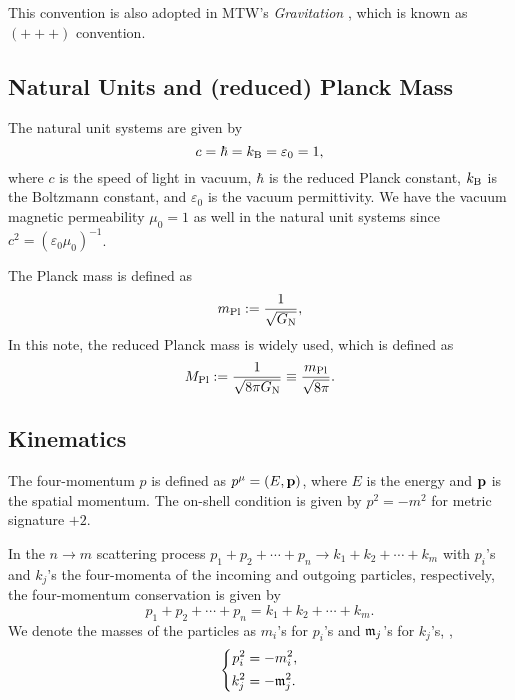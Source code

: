 \documentclass{article}
\begin{document}
            This convention is also adopted in MTW's \textit{Gravitation} \cite{Misner:1973prb}, which is known as $(+ + +)$ convention.

        \subsection{Natural Units and (reduced) Planck Mass}

            The natural unit systems are given by 
            \begin{equation}
                c = \hbar = k_\mathrm{B} = \varepsilon_0 = 1,
            \end{equation}
            where $c$ is the speed of light in vacuum, $\hbar$ is the reduced Planck constant, $k_\mathrm{B}$ is the Boltzmann constant, and $\varepsilon_0$ is the vacuum permittivity.
            We have the vacuum magnetic permeability $\mu_0 = 1$ as well in the natural unit systems since $c^2 = (\varepsilon_0 \mu_0)^{-1}$.
            

            The Planck mass is defined as
            \begin{equation}
                m_\mathrm{Pl} := \frac{1}{\sqrt{G_\mathrm{N}}},
            \end{equation}
            In this note, the reduced Planck mass is widely used, which is defined as
            \begin{equation}
                M_\mathrm{Pl} := \frac{1}{\sqrt{8 \pi G_\mathrm{N}}} \equiv \frac{m_\mathrm{Pl}}{\sqrt{8 \pi}}.
                \label{eq:reduced-Planck-mass}
            \end{equation}

        \subsection{Kinematics}

            The four-momentum $p$ is defined as $p^\mu = (E, \vb{p})$, where $E$ is the energy and $\vb{p}$ is the spatial momentum.
            The on-shell condition is given by $p^2 = -m^2$ for metric signature $+2$.

            In the $n \to m$ scattering process $p_1 + p_2 + \cdots + p_n \to k_1 + k_2 + \cdots + k_m$ with $p_i$'s and $k_j$'s the four-momenta of the incoming and outgoing particles, respectively, the four-momentum conservation is given by
            \begin{equation}
                p_1 + p_2 + \cdots + p_n = k_1 + k_2 + \cdots + k_m.
            \end{equation}
            We denote the masses of the particles as $m_i$'s for $p_i$'s and $\mathfrak{m}_j$'s for $k_j$'s, \ie,
            \begin{equation}
                \left\{
                    \begin{aligned}
                        p_i^2 & = -m_i^2, \\
                        k_j^2 & = -\mathfrak{m}_j^2.
                    \end{aligned}
                \right.
            \end{equation}
            
\end{document}
